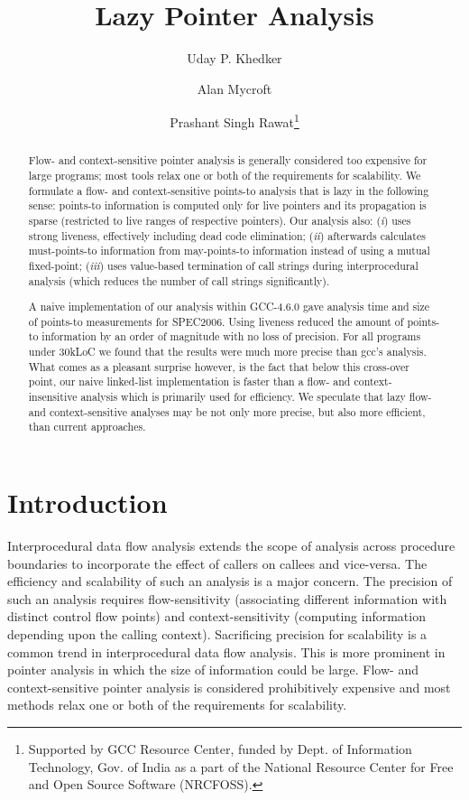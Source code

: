 \documentclass{llncs}
\title{Lazy Pointer Analysis}
\author{Uday P. Khedker\inst{1} \and Alan Mycroft\inst{2} \and Prashant Singh Rawat\inst{1}\thanks{Supported 
by GCC Resource Center, funded by Dept. of Information  Technology, Gov. of India
as a part of the
National Resource Center for Free and Open Source Software
(NRCFOSS).}
}
\institute{Indian Institute of Technology Bombay \\
\email{\{uday,prashantr\}@cse.iitb.ac.in}
\and University of Cambridge \\
\email{Alan.Mycroft@cl.cam.ac.uk}
}
\begin{document}
\maketitle

\begin{abstract}
Flow- and context-sensitive pointer analysis is generally considered
too expensive for large programs; most tools relax one or both of the
requirements for scalability. We formulate a flow- and context-sensitive
points-to analysis that is lazy in the following sense: points-to
information is computed only for live pointers and its propagation is
sparse (restricted to live ranges of respective pointers). Our analysis
also: ({\em i\/}) uses strong liveness, effectively including dead
code elimination; ({\em ii\/}) afterwards calculates must-points-to
information from may-points-to information instead of using a mutual
fixed-point; ({\em iii\/}) uses value-based termination of call strings
during interprocedural analysis (which reduces the number of call
strings significantly).

A naive implementation of our analysis within GCC-4.6.0 gave analysis
time and size of points-to measurements for SPEC2006. Using liveness
reduced the amount of points-to information by an order of magnitude
with no loss of precision. For all programs under 30kLoC we found that
the results were much more precise than gcc's analysis. What comes as
a pleasant surprise however, is the fact that below this cross-over
point, our naive linked-list implementation is faster than a flow-
and context-insensitive analysis which is primarily used for efficiency.
We speculate that lazy flow- and context-sensitive analyses may be not
only more precise, but also more efficient, than current approaches.
\end{abstract}


\section{Introduction}
\label{sec:intro}

Interprocedural data flow analysis extends the scope of analysis across
procedure boundaries to incorporate the effect of callers 
on callees and vice-versa. The efficiency and scalability of such
an analysis is a major concern. The precision of such an analysis
requires flow-sensitivity (associating different
information with distinct control flow points) and context-sensitivity
(computing information depending upon the calling context). Sacrificing
precision for scalability is a common trend in interprocedural data
flow analysis. This is more prominent in pointer analysis in which the
size of information could be large. Flow- and context-sensitive pointer
analysis is considered prohibitively expensive and most methods relax
one or both of the requirements for scalability.
\end{document}
